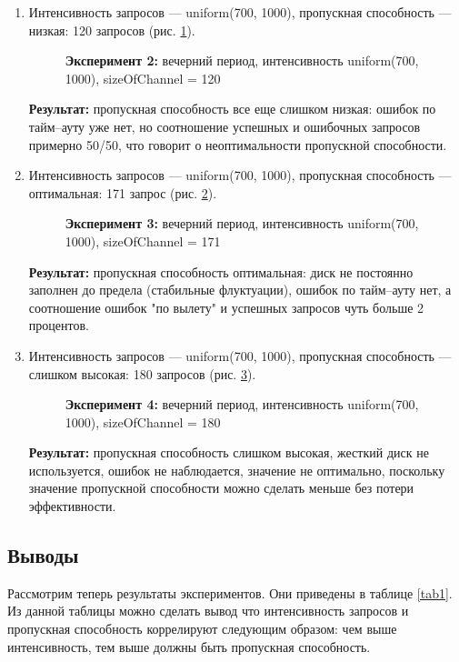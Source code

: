 \begin{itemize}
\begin{enumerate}
        \item Интенсивность запросов --- uniform(700, 1000), пропускная способность --- низкая:
        120 запросов (рис. \ref{evn2}).
        \begin{figure} [h]
            \caption{\textbf{Эксперимент 2:} вечерний период, интенсивность uniform(700, 1000), sizeOfChannel = 120}
            \label{evn2}
        \end{figure}
        \textbf{Результат:} пропускная способность все еще слишком низкая:
        ошибок по тайм--ауту уже нет, но соотношение успешных и ошибочных запросов примерно 50/50, что
        говорит о неоптимальности пропускной способности.
        \newpage

        \item Интенсивность запросов --- uniform(700, 1000), пропускная способность --- оптимальная:
        171 запрос (рис. \ref{evn3}).
        \begin{figure} [h]
            \caption{\textbf{Эксперимент 3:} вечерний период, интенсивность uniform(700, 1000), sizeOfChannel = 171}
            \label{evn3}
        \end{figure}
        \textbf{Результат:} пропускная способность оптимальная: диск не постоянно
        заполнен до предела (стабильные флуктуации), ошибок по тайм--ауту нет, а соотношение ошибок "по вылету"
        и успешных запросов чуть больше 2 процентов.
        \newpage
        \item Интенсивность запросов --- uniform(700, 1000), пропускная способность --- слишком высокая:
        180 запросов (рис. \ref{evn4}).
        \begin{figure} [h]
            \caption{\textbf{Эксперимент 4:} вечерний период, интенсивность uniform(700, 1000), sizeOfChannel = 180}
            \label{evn4}
        \end{figure}
        \textbf{Результат:} пропускная способность слишком высокая, жесткий диск
        не используется, ошибок не наблюдается, значение не оптимально, поскольку значение пропускной способности
        можно сделать меньше без потери эффективности.

    \end{enumerate}
\end{itemize}

\subsection{Выводы}
Рассмотрим теперь результаты экспериментов. Они приведены в таблице \ref{tab1}. Из данной таблицы можно
сделать вывод что интенсивность запросов и пропускная способность коррелируют следующим образом: чем
выше интенсивность, тем выше должны быть пропускная способность.

